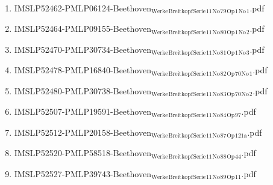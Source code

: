 \documentclass[11pt]{article}
\begin{document}
\begin{enumerate}
\begin{enumerate}
\item IMSLP52462-PMLP06124-Beethoven$_{\text{Werke}}$$_{\text{Breitkopf}}$$_{\text{Serie}}$$_{\text{11}}$$_{\text{No}}$$_{\text{79}}$$_{\text{Op}}$$_{\text{1}}$$_{\text{No}}$$_{\text{1}}$.pdf
\label{sec-1-1-1-1-44-9-7-7}

\item IMSLP52464-PMLP09155-Beethoven$_{\text{Werke}}$$_{\text{Breitkopf}}$$_{\text{Serie}}$$_{\text{11}}$$_{\text{No}}$$_{\text{80}}$$_{\text{Op}}$$_{\text{1}}$$_{\text{No}}$$_{\text{2}}$.pdf
\label{sec-1-1-1-1-44-9-7-8}

\item IMSLP52470-PMLP30734-Beethoven$_{\text{Werke}}$$_{\text{Breitkopf}}$$_{\text{Serie}}$$_{\text{11}}$$_{\text{No}}$$_{\text{81}}$$_{\text{Op}}$$_{\text{1}}$$_{\text{No}}$$_{\text{3}}$.pdf
\label{sec-1-1-1-1-44-9-7-9}

\item IMSLP52478-PMLP16840-Beethoven$_{\text{Werke}}$$_{\text{Breitkopf}}$$_{\text{Serie}}$$_{\text{11}}$$_{\text{No}}$$_{\text{82}}$$_{\text{Op}}$$_{\text{70}}$$_{\text{No}}$$_{\text{1}}$.pdf
\label{sec-1-1-1-1-44-9-7-10}

\item IMSLP52480-PMLP30738-Beethoven$_{\text{Werke}}$$_{\text{Breitkopf}}$$_{\text{Serie}}$$_{\text{11}}$$_{\text{No}}$$_{\text{83}}$$_{\text{Op}}$$_{\text{70}}$$_{\text{No}}$$_{\text{2}}$.pdf
\label{sec-1-1-1-1-44-9-7-11}

\item IMSLP52507-PMLP19591-Beethoven$_{\text{Werke}}$$_{\text{Breitkopf}}$$_{\text{Serie}}$$_{\text{11}}$$_{\text{No}}$$_{\text{84}}$$_{\text{Op}}$$_{\text{97}}$.pdf
\label{sec-1-1-1-1-44-9-7-12}

\item IMSLP52512-PMLP20158-Beethoven$_{\text{Werke}}$$_{\text{Breitkopf}}$$_{\text{Serie}}$$_{\text{11}}$$_{\text{No}}$$_{\text{87}}$$_{\text{Op}}$$_{\text{121a}}$.pdf
\label{sec-1-1-1-1-44-9-7-13}

\item IMSLP52520-PMLP58518-Beethoven$_{\text{Werke}}$$_{\text{Breitkopf}}$$_{\text{Serie}}$$_{\text{11}}$$_{\text{No}}$$_{\text{88}}$$_{\text{Op}}$$_{\text{44}}$.pdf
\label{sec-1-1-1-1-44-9-7-14}

\item IMSLP52527-PMLP39743-Beethoven$_{\text{Werke}}$$_{\text{Breitkopf}}$$_{\text{Serie}}$$_{\text{11}}$$_{\text{No}}$$_{\text{89}}$$_{\text{Op}}$$_{\text{11}}$.pdf
\label{sec-1-1-1-1-44-9-7-15}


\end{enumerate}
\end{enumerate}
\end{document}
